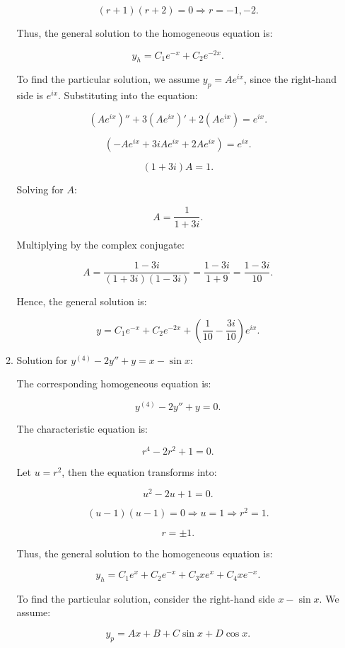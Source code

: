 \documentclass[12pt]{article}
\begin{document}
\begin{enumerate}
\begin{enumerate}
    \[
    (r+1)(r+2) = 0 \Rightarrow r = -1, -2.
    \]

    Thus, the general solution to the homogeneous equation is:

    \[
    y_h = C_1 e^{-x} + C_2 e^{-2x}.
    \]

    To find the particular solution, we assume \( y_p = A e^{ix} \), since the right-hand side is \( e^{ix} \). Substituting into the equation:

    \[
    (Ae^{ix})'' + 3(Ae^{ix})' + 2(Ae^{ix}) = e^{ix}.
    \]

    \[
    (-A e^{ix} + 3iA e^{ix} + 2A e^{ix}) = e^{ix}.
    \]

    \[
    (1 + 3i)A = 1.
    \]

    Solving for \( A \):

    \[
    A = \frac{1}{1+3i}.
    \]

    Multiplying by the complex conjugate:

    \[
    A = \frac{1-3i}{(1+3i)(1-3i)} = \frac{1-3i}{1+9} = \frac{1-3i}{10}.
    \]

    Hence, the general solution is:

    \[
    y = C_1 e^{-x} + C_2 e^{-2x} + \left(\frac{1}{10} - \frac{3i}{10} \right) e^{ix}.
    \]


    \item Solution for  \( y^{(4)} - 2y'' + y = x - \sin x \):

    The corresponding homogeneous equation is:

    \[
    y^{(4)} - 2y'' + y = 0.
    \]

    The characteristic equation is:

    \[
    r^4 - 2r^2 + 1 = 0.
    \]

    Let \( u = r^2 \), then the equation transforms into:

    \[
    u^2 - 2u + 1 = 0.
    \]

    \[
    (u - 1)(u - 1) = 0 \Rightarrow u = 1 \Rightarrow r^2 = 1.
    \]

    \[
    r = \pm 1.
    \]

    Thus, the general solution to the homogeneous equation is:

    \[
    y_h = C_1 e^x + C_2 e^{-x} + C_3 x e^x + C_4 x e^{-x}.
    \]

    To find the particular solution, consider the right-hand side \( x - \sin x \). We assume:

    \[
    y_p = Ax + B + C\sin x + D\cos x.
    \]


\end{enumerate}
\end{enumerate}
\end{document}
